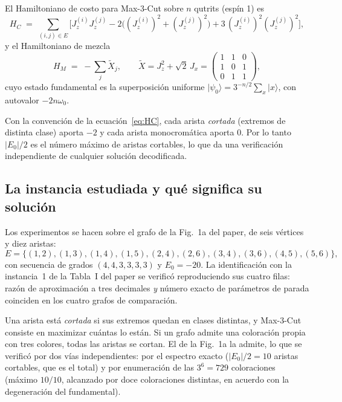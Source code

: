 \documentclass[11pt,a4paper]{article}
\newcommand{\ket}[1]{\lvert #1 \rangle}
\begin{document}
El Hamiltoniano de costo para Max-3-Cut sobre $n$ qutrits (espín 1) es
\begin{equation}
H_C \;=\; \sum_{(i,j)\in E}\Big[ J_z^{(i)}J_z^{(j)} - 2\big((J_z^{(i)})^2+(J_z^{(j)})^2\big) + 3\,(J_z^{(i)})^2 (J_z^{(j)})^2 \Big],
\label{eq:HC}
\end{equation}
y el Hamiltoniano de mezcla
\begin{equation}
H_M \;=\; -\sum_{j} \tilde X_j, \qquad
\tilde X = J_z^2 + \sqrt{2}\,J_x = \begin{pmatrix}1&1&0\\1&0&1\\0&1&1\end{pmatrix},
\label{eq:HM}
\end{equation}
cuyo estado fundamental es la superposición uniforme
$\ket{\psi_0} = 3^{-n/2}\sum_x \ket{x}$, con autovalor $-2n\omega_0$.

Con la convención de la ecuación~\eqref{eq:HC}, cada arista \emph{cortada}
(extremos de distinta clase) aporta $-2$ y cada arista monocromática aporta
$0$. Por lo tanto $|E_0|/2$ es el número máximo de aristas cortables, lo que da
una verificación independiente de cualquier solución decodificada.

\subsection{La instancia estudiada y qué significa su solución}

Los experimentos se hacen sobre el grafo de la Fig.~1a del paper, de seis
vértices y diez aristas:
\begin{equation}
E = \{(1,2),(1,3),(1,4),(1,5),(2,4),(2,6),(3,4),(3,6),(4,5),(5,6)\},
\end{equation}
con secuencia de grados $(4,4,3,3,3,3)$ y $E_0 = -20$. La identificación con la
instancia~1 de la Tabla~I del paper se verificó reproduciendo sus cuatro filas:
razón de aproximación a tres decimales \emph{y} número exacto de parámetros de
parada coinciden en los cuatro grafos de comparación.

Una arista está \emph{cortada} si sus extremos quedan en clases distintas, y
Max-3-Cut consiste en maximizar cuántas lo están. Si un grafo admite una
coloración propia con tres colores, todas las aristas se cortan. El de la
Fig.~1a la admite, lo que se verificó por dos vías independientes: por el
espectro exacto ($|E_0|/2 = 10$ aristas cortables, que es el total) y por
enumeración de las $3^6=729$ coloraciones (máximo $10/10$, alcanzado por doce
coloraciones distintas, en acuerdo con la degeneración del fundamental).
\end{document}
